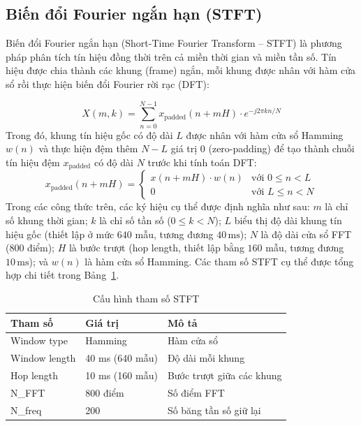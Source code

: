 \subsection{Biến đổi Fourier ngắn hạn (STFT)}

Biến đổi Fourier ngắn hạn (Short-Time Fourier Transform -- STFT) là phương pháp phân tích tín hiệu đồng thời trên cả miền thời gian và miền tần số. Tín hiệu được chia thành các khung (frame) ngắn, mỗi khung được nhân với hàm cửa sổ rồi thực hiện biến đổi Fourier rời rạc (DFT):

\begin{equation}
    X(m, k) = \sum_{n=0}^{N-1} x_{\text{padded}}(n + mH) \cdot e^{-j2\pi kn/N}
    \label{eq:stft}
\end{equation}
Trong đó, khung tín hiệu gốc có độ dài $L$ được nhân với hàm cửa sổ Hamming $w(n)$ và thực hiện đệm thêm $N - L$ giá trị $0$ (zero-padding) để tạo thành chuỗi tín hiệu đệm $x_{\text{padded}}$ có độ dài $N$ trước khi tính toán DFT:
\begin{equation}
    x_{\text{padded}}(n + mH) = \begin{cases} 
      x(n + mH) \cdot w(n) & \text{với } 0 \le n < L \\
      0 & \text{với } L \le n < N 
   \end{cases}
\end{equation}
Trong các công thức trên, các ký hiệu cụ thể được định nghĩa như sau: $m$ là chỉ số khung thời gian; $k$ là chỉ số tần số ($0 \le k < N$); $L$ biểu thị độ dài khung tín hiệu gốc (thiết lập ở mức $640$ mẫu, tương đương $40\,\text{ms}$); $N$ là độ dài cửa sổ FFT ($800$ điểm); $H$ là bước trượt (hop length, thiết lập bằng $160$ mẫu, tương đương $10\,\text{ms}$); và $w(n)$ là hàm cửa sổ Hamming. Các tham số STFT cụ thể được tổng hợp chi tiết trong Bảng~\ref{tab:stft_params}.

\begin{table}[H]
\centering
\caption{Cấu hình tham số STFT}
\label{tab:stft_params}
\begin{tabular}{lll}
\toprule
\textbf{Tham số} & \textbf{Giá trị} & \textbf{Mô tả} \\
\midrule
Window type & Hamming & Hàm cửa sổ \\
Window length & 40 ms (640 mẫu) & Độ dài mỗi khung \\
Hop length & 10 ms (160 mẫu) & Bước trượt giữa các khung \\
N\_FFT & 800 điểm & Số điểm FFT \\
N\_freq & 200 & Số băng tần số giữ lại \\
\bottomrule
\end{tabular}
\end{table}

